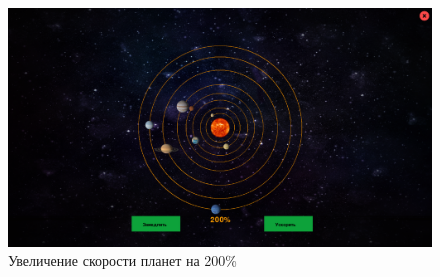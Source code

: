 \documentclass[14pt, oneside]{altsu-report}
\begin{document}
\begin{figure}[H]
    \centering
    \includegraphics[width=0.8\linewidth]{src/test/up_quarter4.png}
    \caption{Увеличение скорости планет на 200\%}
    \label{fig:up-200}
\end{figure}
\end{document}

